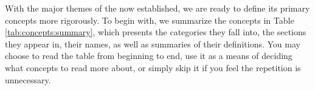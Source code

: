 %
%

With the major themes of the  now established, we are ready to define its primary concepts more rigorously.
To begin with, we summarize the concepts in Table \ref{tab:concepts:summary}, which presents the categories they fall into, the sections they appear in, their names, as well as summaries of their definitions.
You may choose to read the table from beginning to end, use it as a means of deciding what concepts to read more about, or simply skip it if you feel the repetition is unnecessary.

